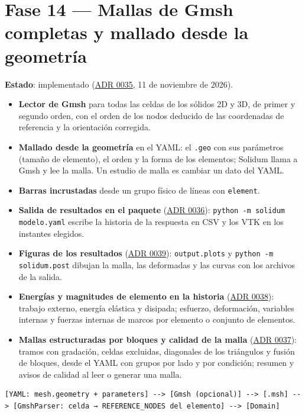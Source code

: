 \documentclass[11pt,oneside]{report}
\begin{document}
\section{Fase 14 --- Mallas de Gmsh completas y mallado desde la geometría}

\textbf{Estado}: implementado (\hyperref[adr:0035]{ADR 0035}, 11 de noviembre de 2026).

\begin{itemize}
  \item \textbf{Lector de Gmsh} para todas las celdas de los sólidos 2D y 3D, de primer y segundo orden, con el orden de los nodos deducido de las coordenadas de referencia y la orientación corregida.
  \item \textbf{Mallado desde la geometría} en el YAML: el \texttt{.geo} con sus parámetros (tamaño de elemento), el orden y la forma de los elementos; Solidum llama a Gmsh y lee la malla. Un estudio de malla es cambiar un dato del YAML.
  \item \textbf{Barras incrustadas} desde un grupo físico de líneas con \texttt{element}.
  \item \textbf{Salida de resultados en el paquete} (\hyperref[adr:0036]{ADR 0036}): \texttt{python -m solidum modelo.\allowbreak{}yaml} escribe la historia de la respuesta en CSV y los VTK en los instantes elegidos.
  \item \textbf{Figuras de los resultados} (\hyperref[adr:0039]{ADR 0039}): \texttt{output.plots} y \texttt{python -m solidum.\allowbreak{}post} dibujan la malla, las deformadas y las curvas con los archivos de la salida.
  \item \textbf{Energías y magnitudes de elemento en la historia} (\hyperref[adr:0038]{ADR 0038}): trabajo externo, energía elástica y disipada; esfuerzo, deformación, variables internas y fuerzas internas de marcos por elemento o conjunto de elementos.
  \item \textbf{Mallas estructuradas por bloques y calidad de la malla} (\hyperref[adr:0037]{ADR 0037}): tramos con gradación, celdas excluidas, diagonales de los triángulos y fusión de bloques, desde el YAML con grupos por lado y por condición; resumen y avisos de calidad al leer o generar una malla.
\end{itemize}

\begin{lstlisting}
[YAML: mesh.geometry + parameters] --> [Gmsh (opcional)] --> [.msh] --> [GmshParser: celda → REFERENCE_NODES del elemento] --> [Domain]

\end{lstlisting}
\end{document}

